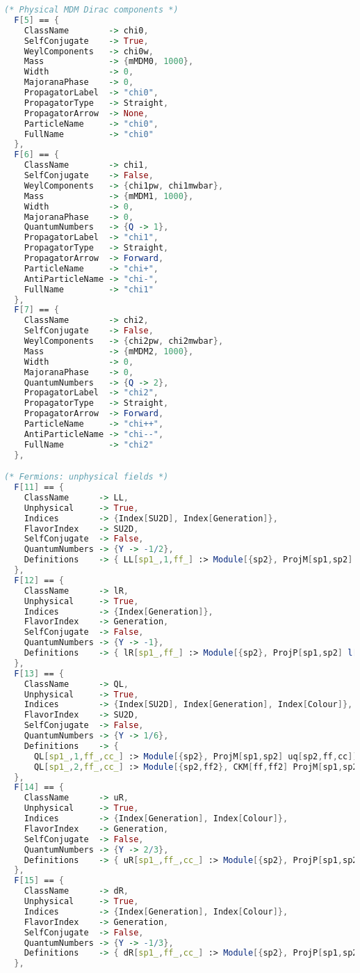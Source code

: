 \documentclass[12pt,twoside,book]{article}
\begin{document}
\begin{lstlisting}[caption=\texttt{mdm.fr}, label=list:mdm, language=Mathematica]
(* Physical MDM Dirac components *)
  F[5] == {
    ClassName        -> chi0,
    SelfConjugate    -> True,
    WeylComponents   -> chi0w,
    Mass             -> {mMDM0, 1000},
    Width            -> 0,
    MajoranaPhase    -> 0,
    PropagatorLabel  -> "chi0",
    PropagatorType   -> Straight,
    PropagatorArrow  -> None,
    ParticleName     -> "chi0",
    FullName         -> "chi0"
  },
  F[6] == {
    ClassName        -> chi1,
    SelfConjugate    -> False,
    WeylComponents   -> {chi1pw, chi1mwbar},
    Mass             -> {mMDM1, 1000},
    Width            -> 0,
    MajoranaPhase    -> 0,
    QuantumNumbers   -> {Q -> 1},
    PropagatorLabel  -> "chi1",
    PropagatorType   -> Straight,
    PropagatorArrow  -> Forward,
    ParticleName     -> "chi+",
    AntiParticleName -> "chi-",
    FullName         -> "chi1"
  },
  F[7] == {
    ClassName        -> chi2,
    SelfConjugate    -> False,
    WeylComponents   -> {chi2pw, chi2mwbar},
    Mass             -> {mMDM2, 1000},
    Width            -> 0,
    MajoranaPhase    -> 0,
    QuantumNumbers   -> {Q -> 2},
    PropagatorLabel  -> "chi2",
    PropagatorType   -> Straight,
    PropagatorArrow  -> Forward,
    ParticleName     -> "chi++",
    AntiParticleName -> "chi--",
    FullName         -> "chi2"
  },

(* Fermions: unphysical fields *)
  F[11] == {
    ClassName      -> LL,
    Unphysical     -> True,
    Indices        -> {Index[SU2D], Index[Generation]},
    FlavorIndex    -> SU2D,
    SelfConjugate  -> False,
    QuantumNumbers -> {Y -> -1/2},
    Definitions    -> { LL[sp1_,1,ff_] :> Module[{sp2}, ProjM[sp1,sp2] vl[sp2,ff]], LL[sp1_,2,ff_] :> Module[{sp2}, ProjM[sp1,sp2] l[sp2,ff]] }
  },
  F[12] == {
    ClassName      -> lR,
    Unphysical     -> True,
    Indices        -> {Index[Generation]},
    FlavorIndex    -> Generation,
    SelfConjugate  -> False,
    QuantumNumbers -> {Y -> -1},
    Definitions    -> { lR[sp1_,ff_] :> Module[{sp2}, ProjP[sp1,sp2] l[sp2,ff]] }
  },
  F[13] == {
    ClassName      -> QL,
    Unphysical     -> True,
    Indices        -> {Index[SU2D], Index[Generation], Index[Colour]},
    FlavorIndex    -> SU2D,
    SelfConjugate  -> False,
    QuantumNumbers -> {Y -> 1/6},
    Definitions    -> {
      QL[sp1_,1,ff_,cc_] :> Module[{sp2}, ProjM[sp1,sp2] uq[sp2,ff,cc]],
      QL[sp1_,2,ff_,cc_] :> Module[{sp2,ff2}, CKM[ff,ff2] ProjM[sp1,sp2] dq[sp2,ff2,cc]] }
  },
  F[14] == {
    ClassName      -> uR,
    Unphysical     -> True,
    Indices        -> {Index[Generation], Index[Colour]},
    FlavorIndex    -> Generation,
    SelfConjugate  -> False,
    QuantumNumbers -> {Y -> 2/3},
    Definitions    -> { uR[sp1_,ff_,cc_] :> Module[{sp2}, ProjP[sp1,sp2] uq[sp2,ff,cc]] }
  },
  F[15] == {
    ClassName      -> dR,
    Unphysical     -> True,
    Indices        -> {Index[Generation], Index[Colour]},
    FlavorIndex    -> Generation,
    SelfConjugate  -> False,
    QuantumNumbers -> {Y -> -1/3},
    Definitions    -> { dR[sp1_,ff_,cc_] :> Module[{sp2}, ProjP[sp1,sp2] dq[sp2,ff,cc]] }
  },


\end{lstlisting}
\end{document}
